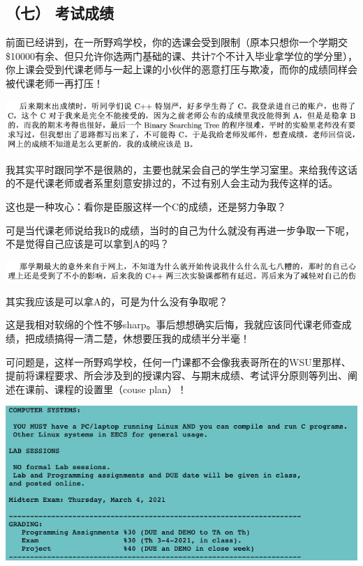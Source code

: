 \documentclass[9pt, b5paper]{article}
\begin{document}
\subsection{（七） 考试成绩}
\label{sec:org4b874ba}

前面已经讲到，在一所野鸡学校，你的选课会受到限制（原本只想你一个学期交\$10000有余、但只允许你选两门基础的课、共计7个不计入毕业拿学位的学分里），你上课会受到代课老师与一起上课的小伙伴的恶意打压与欺凌，而你的成绩同样会被代课老师一再打压！

\begin{center}
\includegraphics[width=.9\linewidth]{./pic/backups_plans_20210424_205932.png}
\end{center}

我其实平时跟同学不是很熟的，主要也就呆会自己的学生学习室里。来给我传这话的不是代课老师或者系里刻意安排过的，不过有别人会主动为我传这样的话。

这也是一种攻心：看你是臣服这样一个C的成绩，还是努力争取？

可是当代课老师说给我B的成绩，当时的自己为什么就没有再进一步争取一下呢，不是觉得自己应该是可以拿到A的吗？

\begin{center}
\includegraphics[width=.9\linewidth]{./pic/backups_plans_20210424_210025.png}
\end{center}

其实我应该是可以拿A的，可是为什么没有争取呢？

这是我相对软绵的个性不够sharp。事后想想确实后悔，我就应该同代课老师查成绩，把成绩搞得一清二楚，休想要压我的成绩半分半毫！

可问题是，这样一所野鸡学校，任何一门课都不会像我表哥所在的WSU里那样、提前将课程要求、所会涉及到的授课内容、与期末成绩、考试评分原则等列出、阐述在课前、课程的设置里（couse plan）！

\begin{center}
\includegraphics[width=.9\linewidth]{./pic/backups_plans_20210425_171604.png}
\end{center}
\end{document}
